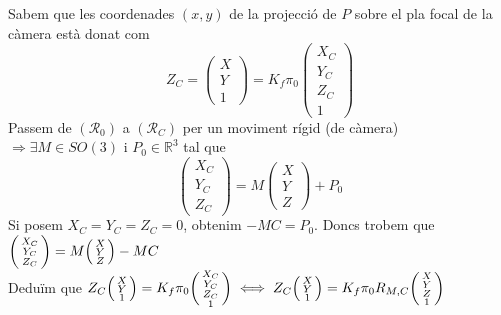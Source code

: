 \documentclass[a4paper,12pt]{article}
\begin{document}
	Sabem que les coordenades $(x,y)$ de la projecció de $P$ sobre el pla focal de la càmera està donat com
	\begin{displaymath}
		Z_C = \begin{pmatrix}X\\Y\\1\end{pmatrix} = K_f\pi_0\begin{pmatrix}X_C\\Y_C\\Z_C\\1\end{pmatrix}
	\end{displaymath}
	Passem de $(\mathcal{R}_0)$ a $(\mathcal{R}_C)$ per un moviment rígid (de càmera) $\Rightarrow \exists M \in SO(3)$ i $P_0 \in \mathbb{R}^3$ tal que
	\begin{displaymath}
		\begin{pmatrix}X_C\\Y_C\\Z_C\end{pmatrix} = M\begin{pmatrix}X\\Y\\Z\end{pmatrix} + P_0
	\end{displaymath}
	Si posem $X_C = Y_C = Z_C = 0$, obtenim $-MC = P_0$. Doncs trobem que $\begin{psmallmatrix} X_C\\Y_C\\Z_C\end{psmallmatrix} = M\begin{psmallmatrix}X\\Y\\Z\end{psmallmatrix} - MC$\\
	Deduïm que $Z_C \begin{psmallmatrix}X\\Y\\1\end{psmallmatrix} = K_f \pi_0 \begin{psmallmatrix} X_C\\Y_C\\Z_C\\1\end{psmallmatrix} \iff Z_C \begin{psmallmatrix}X\\Y\\1\end{psmallmatrix} = K_f \pi_0 R_{M,C}\begin{psmallmatrix}X\\Y\\Z\\1\end{psmallmatrix}$\\
\end{document}
